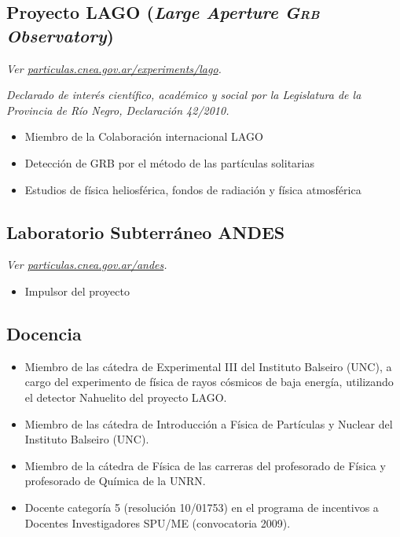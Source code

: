 \documentclass[11pt, a4paper]{article}
\begin{document}
\subsection*{Proyecto LAGO ({\emph{Large Aperture \textsc{Grb} Observatory}})}
\small\textit{Ver
\href{http://particulas.cnea.gov.ar/experiments/lago/}{particulas.cnea.gov.ar/experiments/lago}.
}

{\emph{Declarado de interés científico, académico y social por la Legislatura de la
Provincia de Río Negro, Declaración 42/2010.}}

\begin{itemize}
\item Miembro de la Colaboración internacional LAGO
\item Detección de GRB por el método de las partículas solitarias
\item Estudios de física heliosférica, fondos de radiación y física atmosférica
\end{itemize}

\subsection*{Laboratorio Subterráneo ANDES}
\small\textit{Ver
\href{http://particulas.cnea.gov.ar/andes}{particulas.cnea.gov.ar/andes}.
}
\begin{itemize}
\item Impulsor del proyecto
\end{itemize}

\subsection*{Docencia}
\begin{itemize}
\item Miembro de las cátedra de Experimental III del Instituto Balseiro (UNC),
a cargo del experimento de física de rayos cósmicos de baja energía, utilizando
el detector Nahuelito del proyecto LAGO. 
\item Miembro de las cátedra de Introducción a Física de Partículas y Nuclear
del Instituto Balseiro (UNC).
\item Miembro de la cátedra de Física de las carreras del profesorado de Física
y profesorado de Química de la UNRN.
\item Docente categoría 5 (resolución 10/01753) en el programa de incentivos a
Docentes Investigadores SPU/ME (convocatoria 2009).  \end{itemize}
\end{document}
